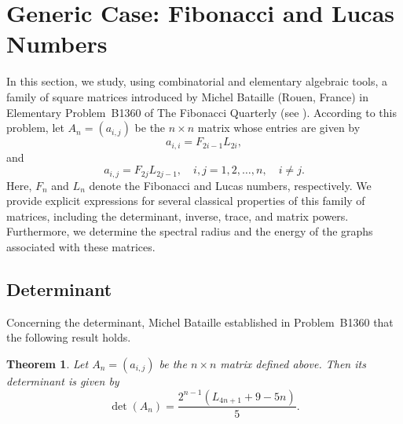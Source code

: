\documentclass[11pt]{birkjour}
\newtheorem{thm}{Theorem}[section]
\theoremstyle{definition}
\theoremstyle{remark}
\numberwithin{equation}{section}
\begin{document}
\section{Generic Case: Fibonacci and Lucas Numbers}\label{Generic}

In this section, we study, using combinatorial and elementary algebraic tools, a family of square matrices introduced by Michel Bataille (Rouen, France) in Elementary Problem~B1360 of The Fibonacci Quarterly (see \cite{fibonacci2024}). According to this problem, let $A_n = \left(a_{i,j}\right)$ be the $n \times n$ matrix whose entries are given by
\[
a_{i,i} = F_{2i-1} L_{2i},
\]
and
\[
a_{i,j} = F_{2j} L_{2j-1}, \quad i,j = 1,2,\ldots,n, \quad i \neq j.
\]
Here, $F_n$ and $L_n$ denote the Fibonacci and Lucas numbers, respectively. We provide explicit expressions for several classical properties of this family of matrices, including the determinant, inverse, trace, and matrix powers. Furthermore, we determine the spectral radius and the energy of the graphs associated with these matrices.


\subsection{Determinant}
\noindent Concerning the determinant, Michel Bataille established in Problem~B1360 that the following result holds.
\begin{thm}
Let $A_n=\left(a_{i, j}\right)$ be the $n \times n$ matrix defined above. Then its determinant is given by
\[
\operatorname{det}\left(A_n\right)=\frac{2^{n-1}\left(L_{4 n+1}+9-5 n\right)}{5}.
\]
\end{thm}
\end{document}
